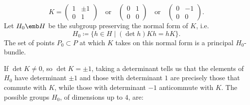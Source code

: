 \[ K=\begin{pmatrix}
    1 & \pm 1\\
    0 & 1
\end{pmatrix} \quad \text{or}\quad \begin{pmatrix}
    0 & 1\\
    0 & 0
\end{pmatrix} \quad \text{or}\quad \begin{pmatrix}
    0 & -1\\
    0 & 0
\end{pmatrix}.\]
Let $H_0\emb H$ be the subgroup preserving the normal form of $ K$, i.e. 
\[H_0\coloneqq \{h\in H\mid (\det h)  K h=h K\}.\]
The set of points $P_0\subset P$ at which $ K$ takes on this normal form is a principal $H_0$-bundle.

If $\det K\neq 0$, so $\det K=\pm 1$, taking a determinant tells us that the elements of $H_0$ have determinant $\pm 1$ and those with determinant $1$ are precisely those that commute with $K$, while those with determinant $-1$ anticommute with $K$. The possible groups $H_0$, of dimensions up to $4$, are:
